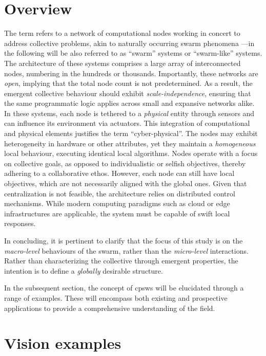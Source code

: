 \section{Overview}
The term refers to a network of computational nodes working in concert to address collective problems, 
 akin to naturally occurring swarm phenomena ---in the following will be also referred to as ``swarm'' systems or ``swarm-like'' systems.
%
The architecture of these systems comprises a large array of interconnected nodes, 
 numbering in the hundreds or thousands. 
% 
Importantly, these networks are \textit{open}, 
 implying that the total node count is not predetermined. 
% 
As a result, 
 the emergent collective behaviour should exhibit \textit{scale-independence}, 
 ensuring that the same programmatic logic applies across small and expansive networks alike.
%
In these systems, each node is tethered to a \textit{physical} entity through sensors and can influence its environment via actuators. 
 This integration of computational and physical elements justifies the term ``cyber-physical''. 
 The nodes may exhibit heterogeneity in hardware or other attributes, 
 yet they maintain a \emph{homogeneous} local behaviour, executing identical local algorithms.
%
Nodes operate with a focus on collective goals, 
 as opposed to individualistic or selfish objectives, 
 thereby adhering to a collaborative ethos.
%
However, each node can still have local objectives, 
 which are not necessarily aligned with the global ones.
% 
Given that centralization is not feasible, 
 the architecture relies on distributed control mechanisms. 
 While modern computing paradigms such as cloud or edge infrastructures are applicable, 
 the system must be capable of swift local responses. 

In concluding, 
 it is pertinent to clarify that the focus of this study is on the \textit{macro-level} behaviours of the swarm, 
 rather than the \textit{micro-level} interactions. 
 Rather than characterizing the collective through emergent properties, 
 the intention is to define a \emph{globally} desirable structure.

In the subsequent section, 
 the concept of \acp{cpsw} will be elucidated through a range of examples. 
 These will encompass both existing and prospective applications to provide a comprehensive understanding of the field.
\section{Vision examples}\label{chap:cpsw:vision}
